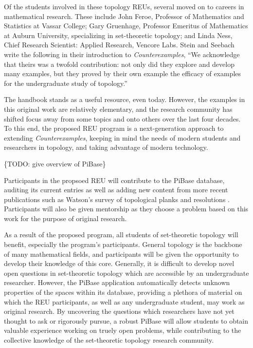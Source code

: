   Of the students involved in these topology REUs, several moved on to careers
  in mathematical research. These include John Feroe,
  Professor of Mathematics and Statistics at Vassar College;
  Gary Gruenhage, Professor Emeritus of Mathematics at Auburn University,
  specializing in set-theoretic topology; and Linda Ness,
  Chief	Research Scientist:	Applied	Research,	Vencore	Labs. Stein and
  Seebach write the following in their introduction to \textit{Counterexamples},
  ``We acknowledge that theirs was a twofold contribution: not only did
  they explore and develop many examples, but they proved by their own
  example the efficacy of examples for the undergraduate study of topology.''

  The handbook stands as a useful resource, even today.
  However, the examples in this original work are relatively elementary,
  and the research community has shifted focus
  away from some topics and onto others over the last four decades.
  To this end,
  the proposed REU program is a next-generation approach to extending
  \textit{Counterexamples}, keeping in mind the needs of
  modern students and researchers in topology, and taking advantage of modern
  technology.

  \{TODO: give overview of PiBase\}

  Participants in the propsoed REU will contribute to the PiBase database, auditing
  its current entries as well as adding new content from more recent
  publications such as Watson's survey of topological planks and
  resolutions \cite{MR1229141}. Participants will also be given mentorship
  as they choose a problem based on this work for the purpose of original
  research.

  As a result of the proposed program, all students of set-theoretic topology
  will benefit, especially the program's participants. General topology
  is the backbone of many mathematical fields, and participants will be
  given the opportunity to develop their knowledge of this core.
  Generally, it is difficult to develop novel open questions in set-theoretic
  topology which are accessible by an undergraduate researcher. However,
  the PiBase application automatically detects unknown properties of
  the spaces within its database, providing a plethora of material
  on which the REU participants, as well as any undergraduate student, may
  work as original research. By uncovering the questions which researchers
  have not yet thought to ask or rigorously pursue, a robust PiBase
  will allow students to obtain valuable experience working on truely
  open problems, while contributing to the collective knowledge of the
  set-theoretic topology research community.

